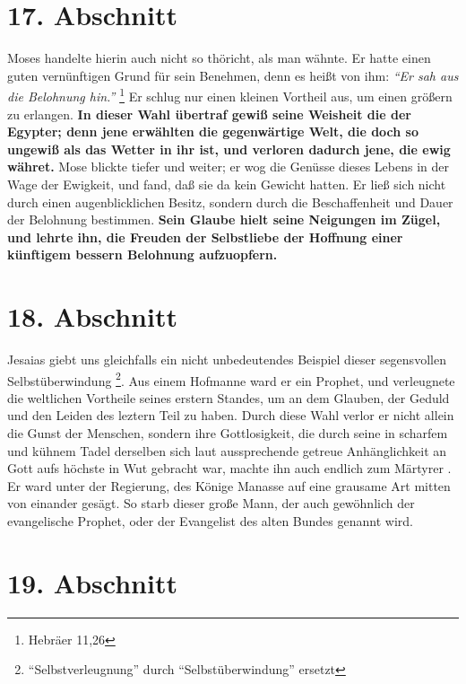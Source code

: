 \section{17. Abschnitt} \label{kap4_ab17}

Moses handelte hierin auch nicht so thöricht, als man wähnte. Er hatte einen
guten vernünftigen Grund für sein Benehmen, denn es heißt von ihm:
\textit{"`Er sah aus die Belohnung hin."'}
\footnote{Hebräer 11,26}
Er schlug nur einen kleinen
Vortheil aus, um einen größern zu erlangen. \textbf{In dieser Wahl übertraf
gewiß seine
Weisheit die der Egypter; denn jene erwählten die gegenwärtige Welt, die doch so
ungewiß als das Wetter in ihr ist, und verloren dadurch jene, die ewig währet.}
Mose blickte tiefer und weiter; er wog die Genüsse dieses Lebens in der Wage der
Ewigkeit,  und fand, daß sie da kein Gewicht hatten. Er
ließ sich nicht durch
einen augenblicklichen Besitz, sondern durch die Beschaffenheit und Dauer der
Belohnung bestimmen. \textbf{Sein Glaube hielt seine Neigungen im Zügel, und
lehrte ihn,
die Freuden der Selbstliebe der Hoffnung einer künftigem bessern Belohnung
aufzuopfern.}

\section{18. Abschnitt} \label{kap4_ab18}

 Jesaias giebt uns gleichfalls ein nicht unbedeutendes
Beispiel dieser
segensvollen Selbstüberwindung \footnote{"`Selbstverleugnung"' durch
"`Selbstüberwindung"' ersetzt}. Aus einem Hofmanne ward er ein Prophet, und
verleugnete die weltlichen Vortheile seines erstern Standes, um an dem Glauben,
der Geduld und den Leiden des leztern Teil zu haben. Durch diese Wahl verlor er
nicht allein die Gunst der Menschen, sondern ihre Gottlosigkeit, die durch seine
in scharfem und kühnem Tadel derselben sich laut aussprechende getreue
Anhänglichkeit an Gott aufs höchste in Wut gebracht war, machte ihn auch
endlich zum Märtyrer . Er ward unter der Regierung, des Könige
Manasse  auf eine
grausame Art mitten von einander gesägt. So starb dieser große Mann, der auch
gewöhnlich der evangelische Prophet, oder der Evangelist des alten
Bundes genannt wird.

\section{19. Abschnitt} \label{kap4_ab19}

